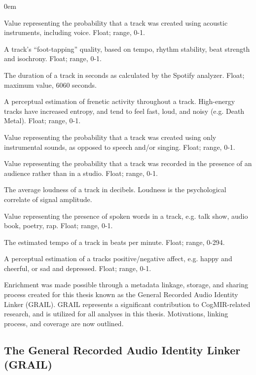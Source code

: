 \documentclass[a4paper]{article}
\begin{document}
\begin{description}\itemsep0em 
\item[Acousticness.] Value representing the probability that a track was created using acoustic instruments, including voice. Float; range, 0-1.
\item[Danceability.] A track’s “foot-tapping” quality, based on tempo, rhythm stability, beat strength and isochrony. Float; range, 0-1.
\item[Duration.] The duration of a track in seconds as calculated by the Spotify analyzer. Float; maximum value, 6060 seconds.
\item[Energy.] A perceptual estimation of frenetic activity throughout a track. High-energy tracks have increased entropy, and tend to feel fast, loud, and noisy (e.g. Death Metal). Float; range, 0-1.
\item[Instrumentalness.] Value representing the probability that a track was created using only instrumental sounds, as opposed to speech and/or singing. Float; range, 0-1.
\item[Liveness.] Value representing the probability that a track was recorded in the presence of an audience rather than in a studio. Float; range, 0-1. 
\item[Loudness.] The average loudness of a track in decibels. Loudness is the psychological correlate of signal amplitude. 
\item[Speechiness.] Value representing the presence of spoken words in a track, e.g. talk show, audio book, poetry, rap. Float; range, 0-1.
\item[Tempo.] The estimated tempo of a track in beats per minute. Float; range, 0-294.
\item[Valence.] A perceptual estimation of a tracks positive/negative affect, e.g. happy and cheerful, or sad and depressed. Float; range, 0-1.
\end{description}

Enrichment was made possible through a metadata linkage, storage, and sharing process created for this thesis known as the General Recorded Audio Identity Linker (\Gls{GRAIL}). \Gls{GRAIL} represents a significant contribution to CogMIR-related research, and is utilized for all analyses in this thesis. Motivations, linking process, and coverage are now outlined. 

\subsection{The General Recorded Audio Identity Linker (GRAIL) \label{sec:grail}}
\end{document}
